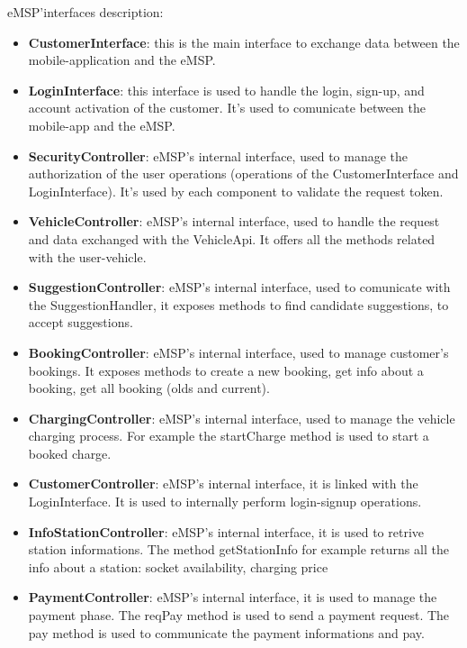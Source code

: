 eMSP'interfaces description:
\begin{itemize}
    \item \textbf{CustomerInterface}: this is the main interface to exchange data between the mobile-application and the eMSP.
    \item \textbf{LoginInterface}: this interface is used to handle the login, sign-up, and account activation of the customer. It's used to comunicate between the mobile-app and the eMSP.
    \item \textbf{SecurityController}: eMSP's internal interface, used to manage the authorization of the user operations (operations of the CustomerInterface and LoginInterface). It's used by each component to validate the request token.
    \item \textbf{VehicleController}: eMSP's internal interface, used to handle the request and data exchanged with the VehicleApi. It offers all the methods related with the user-vehicle.
    \item \textbf{SuggestionController}: eMSP's internal interface, used to comunicate with the SuggestionHandler, it exposes methods to find candidate suggestions, to accept suggestions.
    \item \textbf{BookingController}: eMSP's internal interface, used to manage customer's bookings. It exposes methods to create a new booking, get info about a booking, get all booking (olds and current). 
    \item \textbf{ChargingController}: eMSP's internal interface, used to manage the vehicle charging process. For example the startCharge method is used to start a booked charge.
    \item \textbf{CustomerController}: eMSP's internal interface, it is linked with the LoginInterface. It is used to internally perform login-signup operations.
    \item  \textbf{InfoStationController}: eMSP's internal interface, it is used to retrive station informations. The method getStationInfo for example returns all the info about a station: socket availability, charging price
    \item \textbf{PaymentController}: eMSP's internal interface, it is used to manage the payment phase. The reqPay method is used to send a payment request. The pay method is used to communicate the payment informations and pay.
\end{itemize}

